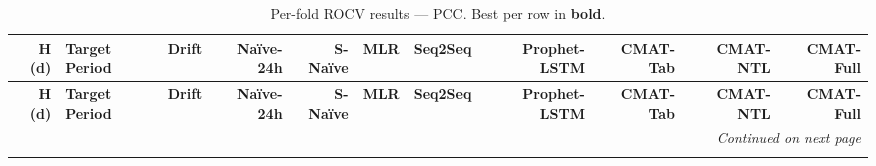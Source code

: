 \begingroup\small\setlength{\tabcolsep}{2pt}\renewcommand{\arraystretch}{1.2}
\begin{longtable}{r l r r r r r r r r r}
\caption{Per-fold ROCV results --- PCC. Best per row in \textbf{bold}.}
\label{tab:baseline_pcc} \\

\toprule
\textbf{H (d)} & \textbf{Target Period} & \textbf{Drift} & \textbf{Na\"ive-24h} & \textbf{S-Na\"ive} & \textbf{MLR} & \textbf{Seq2Seq} & \textbf{Prophet-LSTM} & \textbf{CMAT-Tab} & \textbf{CMAT-NTL} & \textbf{CMAT-Full} \\
\midrule
\endfirsthead

\toprule
\textbf{H (d)} & \textbf{Target Period} & \textbf{Drift} & \textbf{Na\"ive-24h} & \textbf{S-Na\"ive} & \textbf{MLR} & \textbf{Seq2Seq} & \textbf{Prophet-LSTM} & \textbf{CMAT-Tab} & \textbf{CMAT-NTL} & \textbf{CMAT-Full} \\
\midrule
\endhead

\midrule
\multicolumn{11}{r}{\textit{Continued on next page}} \\
\endfoot

\bottomrule
\endlastfoot


\end{longtable}
